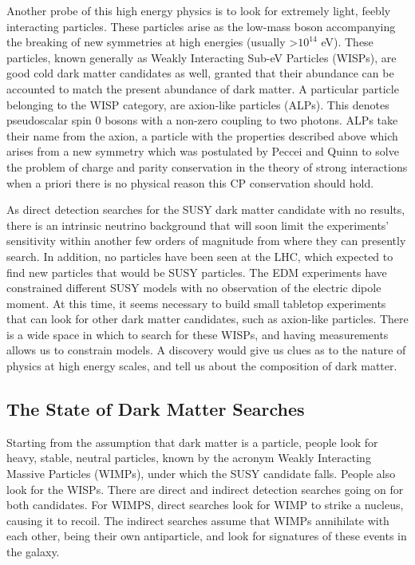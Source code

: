\documentclass[12pt,twosides]{book}
\begin{document}
Another probe of this high energy physics is to look for extremely light, feebly interacting particles. These particles arise as the low-mass boson accompanying the breaking of new symmetries at high energies (usually >$10^{14}$ eV). These particles, known generally as Weakly Interacting Sub-eV Particles (WISPs), are good cold dark matter candidates as well, granted that their abundance can be accounted to match the present abundance of dark matter. A particular particle belonging to the WISP category, are axion-like particles (ALPs). This denotes pseudoscalar spin 0 bosons with a non-zero coupling to two photons. ALPs take their name from the axion, a particle with the properties described above which arises from a new symmetry which was postulated by Peccei and Quinn \cite{peccei77} to solve the problem of charge and parity conservation in the theory of strong interactions when a priori there is no physical reason this CP conservation should hold.

As direct detection searches for  the SUSY dark matter candidate with no results, there is an intrinsic neutrino background that will soon limit the experiments' sensitivity within another few orders of magnitude from where they can presently search. In addition, no particles have been seen at the LHC, which expected to find new particles that would be SUSY particles. The EDM experiments have constrained different SUSY models with no observation of the electric dipole moment. At this time, it seems necessary to build small tabletop experiments that can look for other dark matter candidates, such as axion-like particles. There is a wide space in which to search for these WISPs, and having measurements allows us to constrain models. A discovery would give us clues as to the nature of physics at high energy scales, and tell us about the composition of dark matter.

\subsection{The State of Dark Matter Searches}

Starting from the assumption that dark matter is a particle, people look for heavy, stable, neutral particles, known by the acronym Weakly Interacting Massive Particles (WIMPs), under which the SUSY candidate falls. People also look for the WISPs. There are direct and indirect detection searches going on for both candidates. For WIMPS, direct searches look for WIMP to strike a nucleus, causing it to recoil. The indirect searches assume that WIMPs annihilate with each other, being their own antiparticle, and look for signatures of these events in the galaxy.
\end{document}
